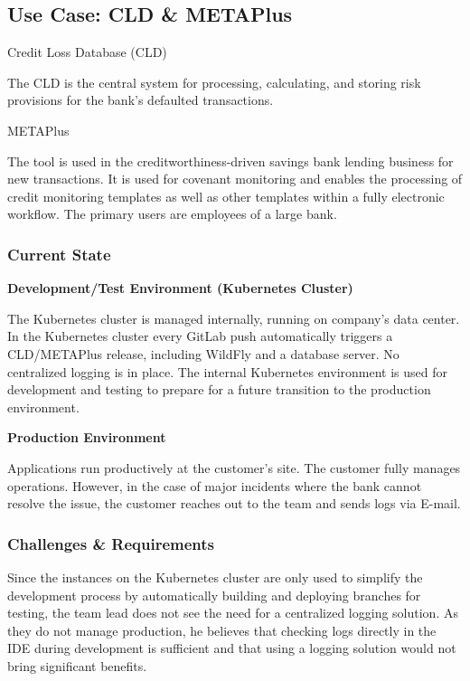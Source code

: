 \documentclass[../main.tex]{subfiles}
\begin{document}
\subsection{Use Case: CLD \& METAPlus}

Credit Loss Database (CLD)

The CLD is the central system for processing, calculating, and storing risk provisions for the bank's defaulted transactions.

METAPlus

The tool is used in the creditworthiness-driven savings bank lending business for new transactions. It is used for covenant monitoring and enables the processing of credit monitoring templates as well as other templates within a fully electronic workflow.
The primary users are employees of a large bank.

\subsubsection{Current State}

\textbf{Development/Test Environment (Kubernetes Cluster)}

The Kubernetes cluster is managed internally, running on company's data center. In the Kubernetes cluster every GitLab push automatically triggers a CLD/METAPlus release, including WildFly and a database server. No centralized logging is in place. The internal Kubernetes environment is used for development and testing to prepare for a future transition to the production environment.

\textbf{Production Environment}

Applications run productively at the customer’s site. The customer fully manages operations. However, in the case of major incidents where the bank cannot resolve the issue, the customer reaches out to the team and sends logs via E-mail.

\subsubsection{Challenges \& Requirements}

Since the instances on the Kubernetes cluster are only used to simplify the development process by automatically building and deploying branches for testing, the team lead does not see the need for a centralized logging solution. As they do not manage production, he believes that checking logs directly in the IDE during development is sufficient and that using a logging solution would not bring significant benefits.
\end{document}
